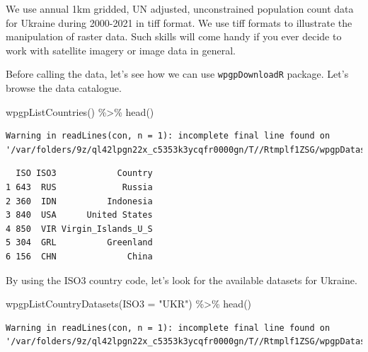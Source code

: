 \documentclass[
  letterpaper,
  DIV=11,
  numbers=noendperiod]{scrreprt}
\newenvironment{Shaded}{\begin{snugshade}}{\end{snugshade}}
\newcommand{\AttributeTok}[1]{\textcolor[rgb]{0.40,0.45,0.13}{#1}}
\newcommand{\FunctionTok}[1]{\textcolor[rgb]{0.28,0.35,0.67}{#1}}
\newcommand{\NormalTok}[1]{\textcolor[rgb]{0.00,0.23,0.31}{#1}}
\newcommand{\SpecialCharTok}[1]{\textcolor[rgb]{0.37,0.37,0.37}{#1}}
\newcommand{\StringTok}[1]{\textcolor[rgb]{0.13,0.47,0.30}{#1}}
\begin{document}
We use annual 1km gridded, UN adjusted, unconstrained population count
data for Ukraine during 2000-2021 in tiff format. We use tiff formats to
illustrate the manipulation of raster data. Such skills will come handy
if you ever decide to work with satellite imagery or image data in
general.

Before calling the data, let's see how we can use \texttt{wpgpDownloadR}
package. Let's browse the data catalogue.

\begin{Shaded}
\begin{Highlighting}[]
\FunctionTok{wpgpListCountries}\NormalTok{() }\SpecialCharTok{\%\textgreater{}\%} 
  \FunctionTok{head}\NormalTok{()}
\end{Highlighting}
\end{Shaded}

\begin{verbatim}
Warning in readLines(con, n = 1): incomplete final line found on
'/var/folders/9z/ql42lpgn22x_c5353k3ycqfr0000gn/T//Rtmplf1ZSG/wpgpDatasets.md5'
\end{verbatim}

\begin{verbatim}
  ISO ISO3            Country
1 643  RUS             Russia
2 360  IDN          Indonesia
3 840  USA      United States
4 850  VIR Virgin_Islands_U_S
5 304  GRL          Greenland
6 156  CHN              China
\end{verbatim}

By using the ISO3 country code, let's look for the available datasets
for Ukraine.

\begin{Shaded}
\begin{Highlighting}[]
\FunctionTok{wpgpListCountryDatasets}\NormalTok{(}\AttributeTok{ISO3 =} \StringTok{"UKR"}\NormalTok{) }\SpecialCharTok{\%\textgreater{}\%} 
  \FunctionTok{head}\NormalTok{()}
\end{Highlighting}
\end{Shaded}

\begin{verbatim}
Warning in readLines(con, n = 1): incomplete final line found on
'/var/folders/9z/ql42lpgn22x_c5353k3ycqfr0000gn/T//Rtmplf1ZSG/wpgpDatasets.md5'
\end{verbatim}
\end{document}
